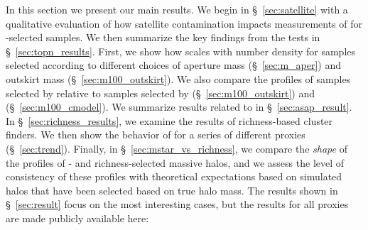 \documentclass[fleqn,usenatbib,useAMS]{mnras}
\begin{document}
\begin{CJK*}{UTF8}{gbsn}
    In this section we present our main results. 
    We begin in \S\ \ref{sec:satellite} with a qualitative evaluation of how satellite contamination
    impacts measurements of \dsigma{} for \mstar{}-selected samples.
    We then summarize the key findings from the \topn{} tests in \S\ \ref{sec:topn_results}. 
    First, we show how \scatterMhaloObsSym{} scales with number density for samples selected
    according to different choices of aperture mass (\S\ \ref{sec:m_aper}) and outskirt mass (\S\
    \ref{sec:m100_outskirt}).
    We also compare the \dsigma{} profiles of samples selected by  relative to samples
    selected by \menve{50}{100} (\S\ \ref{sec:m100_outskirt}) and \mcmodel{} (\S\
    \ref{sec:m100_cmodel}).
    We summarize results related to \masap{} in \S\ \ref{sec:asap_result}.
    In \S\ \ref{sec:richness_results}, we examine the \topn{} results of richness-based cluster
    finders.
    We then show the behavior of \scatterMhaloObsSym{} for a series of different \mvir{} proxies
    (\S\ \ref{sec:trend}).
    Finally, in \S\ \ref{sec:mstar_vs_richness}, we compare the {\em shape} of the \dsigma{}
    profiles of \mstar{}- and richness-selected massive halos, and we assess the level of
    consistency of these profiles with theoretical expectations based on simulated halos that have
    been selected based on true halo mass. 
    The results shown in \S\ \ref{sec:result} focus on the most interesting cases, but the \topn{}
    results for all proxies are made publicly available here:
    \href{https://github.com/dr-guangtou/jianbing/tree/master/data/results}{\faGithub}
    

\end{CJK*}
\end{document}
